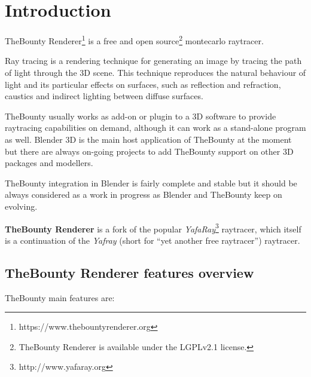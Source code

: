 \chapter*{Introduction}

TheBounty Renderer\footnote{https://www.thebountyrenderer.org} is a free and open source\footnote{TheBounty Renderer is available under the LGPLv2.1 license.} montecarlo raytracer.

\bigskip

Ray tracing is a rendering technique for generating an image by tracing the path of light through the 3D scene. This technique reproduces the natural behaviour of light and its particular effects on surfaces, such as reflection and refraction, caustics and indirect lighting between diffuse surfaces.

TheBounty usually works as add-on or plugin to a 3D software to provide raytracing capabilities on demand, although it can work as a stand-alone program as well. Blender 3D is the main host application of TheBounty at the moment but there are always on-going projects to add TheBounty support on other 3D packages and modellers.

TheBounty integration in Blender is fairly complete and stable but it should be always considered as a work in progress as Blender and TheBounty keep on evolving. 

\textbf{TheBounty Renderer} is a fork of the popular \textit{YafaRay}\footnote{http://www.yafaray.org} raytracer, which itself is a continuation of the \textit{Yafray} (short for ``yet another free raytracer'') raytracer.


\section*{TheBounty Renderer features overview}

TheBounty main features are:

